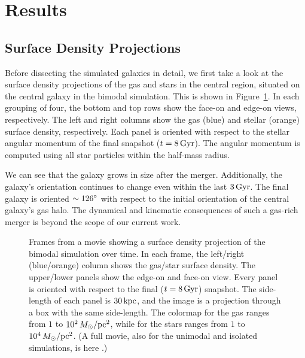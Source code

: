 \section{Results}\label{sec:results}
\subsection{Surface Density Projections}\label{ssec:projections}
Before dissecting the simulated galaxies in detail, we first take a look at the surface density projections of the gas and stars in the central region, situated on the central galaxy in the bimodal simulation. This is shown in Figure~\ref{fig:projections}. In each grouping of four, the bottom and top rows show the face-on and edge-on views, respectively. The left and right columns show the gas (blue) and stellar (orange) surface density, respectively. Each panel is oriented with respect to the stellar angular momentum of the final snapshot ($t=8\,\textrm{Gyr}$). The angular momentum is computed using all star particles within the half-mass radius.

We can see that the galaxy grows in size after the merger. Additionally, the galaxy's orientation continues to change even within the last $3\,\textrm{Gyr}$. The final galaxy is oriented $\sim126\degree$ with respect to the initial orientation of the central galaxy's gas halo. The dynamical and kinematic consequences of such a gas-rich merger is beyond the scope of our current work.

\begin{figure*}
  \centering

  \caption{Frames from a movie showing a surface density projection of the bimodal simulation over time. In each frame, the left/right (blue/orange) column shows the gas/star surface density. The upper/lower panels show the edge-on and face-on view. Every panel is oriented with respect to the final ($t=8\,\textrm{Gyr}$) snapshot. The side-length of each panel is $30\,\textrm{kpc}$, and the image is a projection through a box with the same side-length. The colormap for the gas ranges from $1$ to $10^2\,M_{\odot}/\textrm{pc}^2$, while for the stars ranges from $1$ to $10^4\,M_{\odot}/\textrm{pc}^2$. (A full movie, also for the unimodal and isolated simulations, is here .)}
  \label{fig:projections}
\end{figure*}

